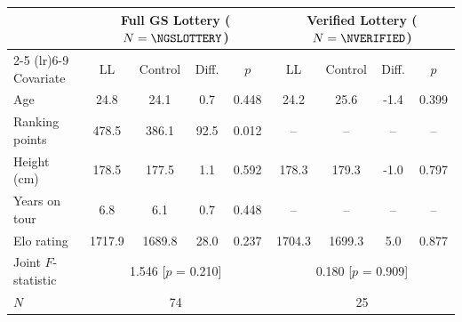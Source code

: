 \begin{tabular}{l cccc cccc}
\toprule
 & \multicolumn{4}{c}{Full GS Lottery ($N=\NGSLOTTERY$)} & \multicolumn{4}{c}{Verified Lottery ($N=\NVERIFIED$)} \\
\cmidrule(lr){2-5} \cmidrule(lr){6-9}
Covariate & LL & Control & Diff. & $p$ & LL & Control & Diff. & $p$ \\
\midrule
Age & 24.8 & 24.1 & 0.7 & 0.448 & 24.2 & 25.6 & -1.4 & 0.399 \\
Ranking points & 478.5 & 386.1 & 92.5 & 0.012 & -- & -- & -- & -- \\
Height (cm) & 178.5 & 177.5 & 1.1 & 0.592 & 178.3 & 179.3 & -1.0 & 0.797 \\
Years on tour & 6.8 & 6.1 & 0.7 & 0.448 & -- & -- & -- & -- \\
Elo rating & 1717.9 & 1689.8 & 28.0 & 0.237 & 1704.3 & 1699.3 & 5.0 & 0.877 \\
\midrule
Joint $F$-statistic & \multicolumn{4}{c}{1.546 [$p$ = 0.210]} & \multicolumn{4}{c}{0.180 [$p$ = 0.909]} \\
$N$ & \multicolumn{4}{c}{74} & \multicolumn{4}{c}{25} \\
\bottomrule
\end{tabular}
